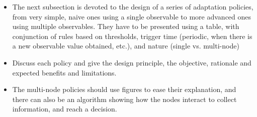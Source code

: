 {\begin{itemize}
	\item The next subsection is devoted to the design of a series of adaptation policies, from very simple, naive ones using a single observable to more advanced ones using multiple observables. They have to be presented using a table, with conjunction of rules based on thresholds, trigger time (periodic, when there is a new observable value obtained, etc.), and nature (single vs. multi-node)
	\item Discuss each policy and give the design principle, the objective, rationale and expected benefits and limitations.
	\item The multi-node policies should use figures to ease their explanation, and there can also be an algorithm showing how the nodes interact to collect information, and reach a decision.
\end{itemize}
}


